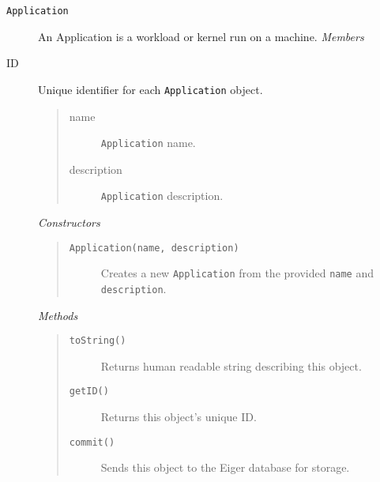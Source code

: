 \begin{description}
\item[\texttt{Application}] An Application is a workload or kernel run on a machine.
  {\em Members}
    \item[ID] Unique identifier for each \texttt{Application} object.
	\begin{quote}
	\begin{description}
    \item[name] \texttt{Application} name.
    \item[description] \texttt{Application} description. 
	\end{description}
	\end{quote}
  {\em Constructors}
	\begin{quote}
	\begin{description}
    \item[\texttt{Application(name, description)}] Creates a new \texttt{Application} from the provided \texttt{name} and \texttt{description}. 
	\end{description}
	\end{quote}
	{\em Methods}
	\begin{quote}
	\begin{description}
		\item[\texttt{toString()}] Returns human readable string describing this object.
		\item[\texttt{getID()}] Returns this object's unique ID.
	\item[\texttt{commit()}] Sends this object to the Eiger database for storage.
	\end{description}
	\end{quote}


\end{description}
